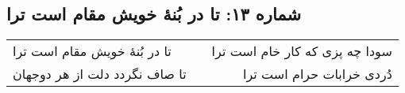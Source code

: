 \begin{center}
\section*{شماره ۱۳: تا در بُنۀ خویش مقام است ترا}
\label{sec:013}
\begin{longtable}{l p{0.5cm} r}
تا در بُنهٔ خویش مقام است ترا
&&
سودا چه پزی که کار خام است ترا
\\
تا صاف نگردد دلت از هر دوجهان
&&
دُردی خرابات حرام است ترا
\\
\end{longtable}
\end{center}
